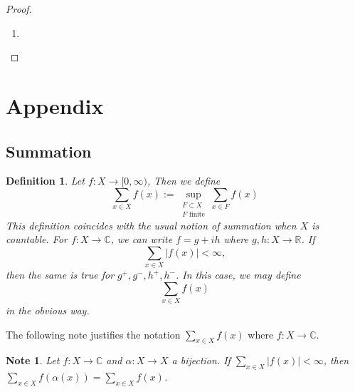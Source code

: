 \documentclass[12pt]{amsart}
\newtheorem{defn}[thm]{Definition}
\newtheorem{note}[thm]{Note}
\newcommand{\al}{\alpha}
\newcommand{\C}{\mathbb{C}}
\newcommand{\R}{\mathbb{R}}
\newcommand{\Rg}{[0,\infty)}
\begin{document}
\begin{proof}
	\begin{enumerate}
		\item 
	\end{enumerate}
\end{proof}







\newpage

\section{Appendix}

\subsection{Summation}

\begin{defn}
	Let $f:X \rightarrow \Rg$, Then we define $$\sum_{x \in X} f(x) := \sup_{\substack{F \subset X \\ F \text{ finite}}} \sum_{x \in F} f(x)$$ This definition coincides with the usual notion of summation when $X$ is countable. For $f:X \rightarrow \C$, we can write $f = g +ih$ where $g,h:X \rightarrow \R$. If $$\sum_{x \in X}|f(x)| < \infty,$$ then the same is true for $g^+,g^-,h^+,h^-$. In this case, we may define $$\sum_{x \in X} f(x)$$ in the obvious way.
\end{defn} 

The following note justifies the notation $\sum_{x \in X}f(x)$ where $f:X \rightarrow \C$.

\begin{note}
	Let $f:X \rightarrow \C$ and $\al:X \rightarrow X$ a bijection. If $\sum_{x \in X}|f(x)|< \infty$, then $\sum_{x \in X}f( \al (x)) = \sum_{x \in X}f(x) $.
\end{note}
\end{document}
